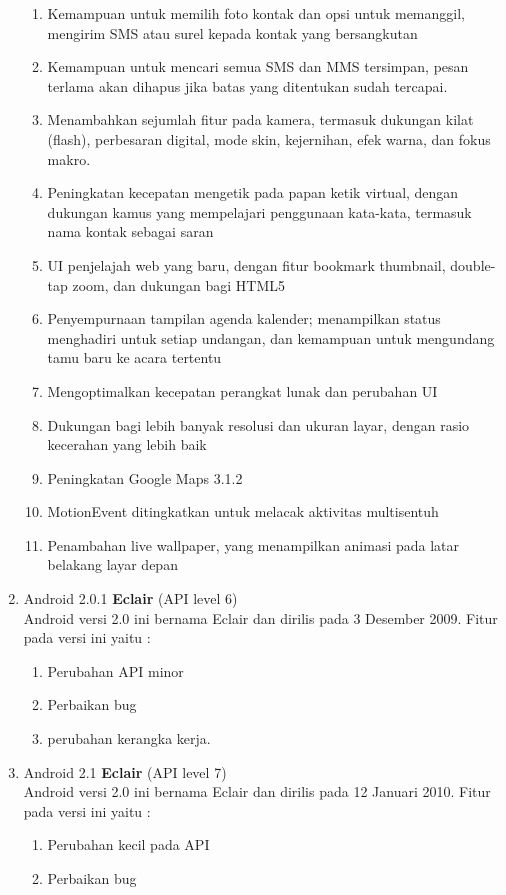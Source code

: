 \begin{enumerate}
\begin{enumerate}
    \item Kemampuan untuk memilih foto kontak dan opsi untuk memanggil, mengirim SMS atau surel kepada kontak yang bersangkutan
    \item Kemampuan untuk mencari semua SMS dan MMS tersimpan, pesan terlama akan dihapus jika batas yang ditentukan sudah tercapai.
    \item Menambahkan sejumlah fitur pada kamera, termasuk dukungan kilat (flash), perbesaran digital, mode skin, kejernihan, efek warna, dan fokus makro.
    \item Peningkatan kecepatan mengetik pada papan ketik virtual, dengan dukungan kamus yang mempelajari penggunaan kata-kata, termasuk nama kontak sebagai saran
    \item UI penjelajah web yang baru, dengan fitur bookmark thumbnail, double-tap zoom, dan dukungan bagi HTML5
    \item Penyempurnaan tampilan agenda kalender; menampilkan status menghadiri untuk setiap undangan, dan kemampuan untuk mengundang tamu baru ke acara tertentu
    \item Mengoptimalkan kecepatan perangkat lunak dan perubahan UI
    \item Dukungan bagi lebih banyak resolusi dan ukuran layar, dengan rasio kecerahan yang lebih baik
    \item Peningkatan Google Maps 3.1.2
    \item MotionEvent ditingkatkan untuk melacak aktivitas multisentuh
    \item Penambahan live wallpaper, yang menampilkan animasi pada latar belakang layar depan
\end{enumerate}

\item Android 2.0.1 \textbf{Eclair} (API level 6)\\
Android versi 2.0 ini bernama Eclair dan dirilis pada 3 Desember 2009. Fitur pada versi ini yaitu :
\begin{enumerate}
    \item Perubahan API minor
    \item Perbaikan bug
    \item perubahan kerangka kerja.
\end{enumerate}

\item Android 2.1 \textbf{Eclair} (API level 7)\\
Android versi 2.0 ini bernama Eclair dan dirilis pada 12 Januari 2010. Fitur pada versi ini yaitu :
\begin{enumerate}
    \item Perubahan kecil pada API 
    \item Perbaikan bug
\end{enumerate}


\end{enumerate}
